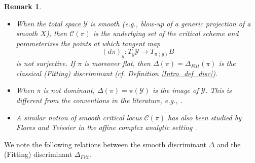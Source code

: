 \documentclass[12pt]{amsart}
\newtheorem{remark}[theorem]{Remark}
\begin{document}
\begin{remark}\normalfont
\begin{itemize}
    \item[(1)] 
    When the total space $\mathcal Y$ is smooth (e.g., blow-up of a generic projection of a smooth $X$), then  $\mathcal{C}(\pi)$ is the underlying set of the critical scheme and parameterizes the points at which tangent map
$$(d\pi)_y\colon T_y\mathcal{Y}\to T_{\pi(y)} B$$
is not surjective. If $\pi$ is moreover flat, then $\Delta(\pi)=\Delta_{Fitt}(\pi)$ is the classical (Fitting) discriminant (cf. Definition \ref{Intro_def_disc}). 

\item[(2)] When $\pi$ is not dominant, $\Delta(\pi)=\pi(\mathcal Y)$ is the image of $\mathcal Y$. This is different from the conventions in the literature, e.g., \cite[Definition 2.15]{Shi06}. %
\item[(3)] A similar notion of smooth critical locus $\mathcal C(\pi)$ has also been studied by Flores and Teissier in the affine complex analytic setting \cite{FT18}.
\end{itemize}
\end{remark}



 We note the following relations between the smooth discriminant $\Delta$ and the (Fitting) discriminant $\Delta_{Fitt}$.



\end{document}
